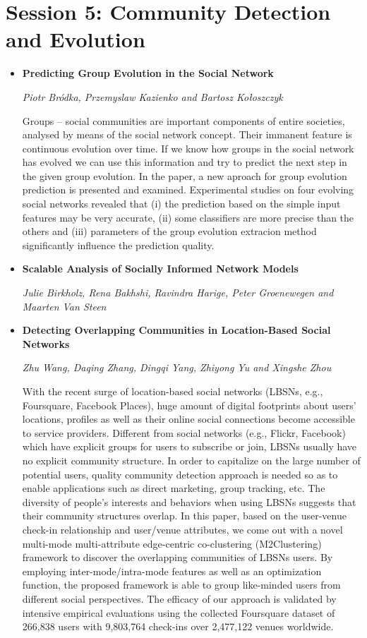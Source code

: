 \section{Session 5: Community Detection and Evolution}
\begin{itemize}

\item \textbf{Predicting Group Evolution in the Social Network}

\textit{Piotr Bródka, Przemyslaw Kazienko and Bartosz Kołoszczyk}

Groups – social communities are important components of entire societies,
analysed by means of the social network concept. Their immanent feature is
continuous evolution over time. If we know how groups in the social network has
evolved we can use this information and try to predict the next step in the
given group evolution. In the paper, a new aproach for group evolution
prediction is presented and examined. Experimental studies on four evolving
social networks revealed that (i) the prediction based on the simple input
features may be very accurate, (ii) some classifiers are more precise than the
others and (iii) parameters of the group evolution extracion method
significantly influence the prediction quality.


\item \textbf{Scalable Analysis of Socially Informed Network Models}

\textit{Julie Birkholz, Rena Bakhshi, Ravindra Harige, Peter Groenewegen and
Maarten Van Steen}

\item \textbf{Detecting Overlapping Communities in Location-Based Social
Networks}

\textit{Zhu Wang, Daqing Zhang, Dingqi Yang, Zhiyong Yu and Xingshe Zhou}

With the recent surge of location-based social networks (LBSNs, e.g.,
Foursquare, Facebook Places), huge amount of digital footprints about users'
locations, profiles as well as their online social connections become accessible
to service providers. Different from social networks (e.g., Flickr, Facebook)
which have explicit groups for users to subscribe or join, LBSNs usually have no
explicit community structure. In order to capitalize on the large number of
potential users, quality community detection approach is needed so as to enable
applications such as direct marketing, group tracking, etc. The diversity of
people's interests and behaviors when using LBSNs suggests that their community
structures overlap. In this paper, based on the user-venue check-in relationship
and user/venue attributes, we come out with a novel multi-mode multi-attribute
edge-centric co-clustering (M2Clustering) framework to discover the overlapping
communities of LBSNs users. By employing inter-mode/intra-mode features as well
as an optimization function, the proposed framework is able to group like-minded
users from different social perspectives. The efficacy of our approach is
validated by intensive empirical evaluations using the collected Foursquare
dataset of 266,838 users with 9,803,764 check-ins over 2,477,122 venues
worldwide.


\end{itemize}

